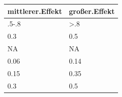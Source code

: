 \documentclass[12pt,ngerman,]{book}
\theoremstyle{definition}
\theoremstyle{definition}
\theoremstyle{remark}
\begin{document}
\begin{longtable}[]{@{}ll@{}}
\toprule
\begin{minipage}[b]{0.25\columnwidth}\raggedright\strut
mittlerer.Effekt\strut
\end{minipage} & \begin{minipage}[b]{0.20\columnwidth}\raggedright\strut
großer.Effekt\strut
\end{minipage}\tabularnewline
\midrule
\endhead
\begin{minipage}[t]{0.25\columnwidth}\raggedright\strut
.5-.8\strut
\end{minipage} & \begin{minipage}[t]{0.20\columnwidth}\raggedright\strut
\textgreater{}.8\strut
\end{minipage}\tabularnewline
\begin{minipage}[t]{0.25\columnwidth}\raggedright\strut
0.3\strut
\end{minipage} & \begin{minipage}[t]{0.20\columnwidth}\raggedright\strut
0.5\strut
\end{minipage}\tabularnewline
\begin{minipage}[t]{0.25\columnwidth}\raggedright\strut
NA\strut
\end{minipage} & \begin{minipage}[t]{0.20\columnwidth}\raggedright\strut
NA\strut
\end{minipage}\tabularnewline
\begin{minipage}[t]{0.25\columnwidth}\raggedright\strut
0.06\strut
\end{minipage} & \begin{minipage}[t]{0.20\columnwidth}\raggedright\strut
0.14\strut
\end{minipage}\tabularnewline
\begin{minipage}[t]{0.25\columnwidth}\raggedright\strut
0.15\strut
\end{minipage} & \begin{minipage}[t]{0.20\columnwidth}\raggedright\strut
0.35\strut
\end{minipage}\tabularnewline
\begin{minipage}[t]{0.25\columnwidth}\raggedright\strut
0.3\strut
\end{minipage} & \begin{minipage}[t]{0.20\columnwidth}\raggedright\strut
0.5\strut
\end{minipage}\tabularnewline
\bottomrule
\end{longtable}
\end{document}
